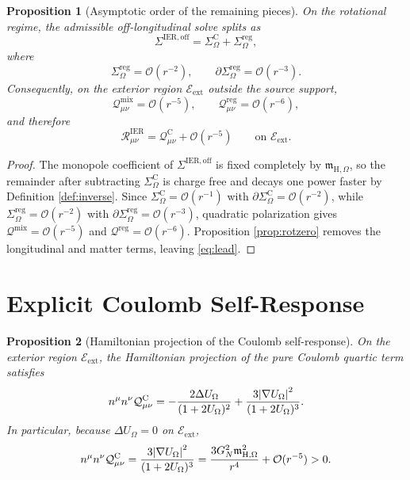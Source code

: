 \documentclass[11pt]{article}
\newcommand{\SigmaOff}{\Sigma^{\mathrm{IER,off}}}
\newcommand{\SigmaC}{\Sigma^{\mathrm{C}}}
\newcommand{\SigmaReg}{\Sigma^{\mathrm{reg}}}
\newcommand{\HamChargeOmega}{\mathfrak m_{\mathrm H,\Omega}}
\newcommand{\Exterior}{\mathcal E_{\mathrm{ext}}}
\newtheorem{proposition}{Proposition}
\begin{document}
\begin{proposition}[Asymptotic order of the remaining pieces]
\label{prop:orders}
On the rotational regime, the admissible off-longitudinal solve splits as
\begin{equation}
\SigmaOff=\SigmaC_\Omega+\SigmaReg_\Omega,
\label{eq:offsplit}
\end{equation}
where
\begin{equation}
\SigmaReg_\Omega=\mathcal O(r^{-2}),
\qquad
\partial\SigmaReg_\Omega=\mathcal O(r^{-3}).
\label{eq:regomega}
\end{equation}
Consequently, on the exterior region \(\Exterior\) outside the source support,
\begin{equation}
\mathcal Q_{\mu\nu}^{\mathrm{mix}}=\mathcal O(r^{-5}),
\qquad
\mathcal Q_{\mu\nu}^{\mathrm{reg}}=\mathcal O(r^{-6}),
\label{eq:qorders}
\end{equation}
and therefore
\begin{equation}
\mathcal R_{\mu\nu}^{\mathrm{IER}}
=
\mathcal Q_{\mu\nu}^{\mathrm C}
+\mathcal O(r^{-5})
\qquad
\text{on }\Exterior.
\label{eq:lead}
\end{equation}
\end{proposition}

\begin{proof}
The monopole coefficient of \(\SigmaOff\) is fixed completely by \(\HamChargeOmega\), so the remainder after subtracting \(\SigmaC_\Omega\) is charge free and decays one power faster by Definition \ref{def:inverse}. Since \(\SigmaC_\Omega=\mathcal O(r^{-1})\) with \(\partial\SigmaC_\Omega=\mathcal O(r^{-2})\), while \(\SigmaReg_\Omega=\mathcal O(r^{-2})\) with \(\partial\SigmaReg_\Omega=\mathcal O(r^{-3})\), quadratic polarization gives \(\mathcal Q^{\mathrm{mix}}=\mathcal O(r^{-5})\) and \(\mathcal Q^{\mathrm{reg}}=\mathcal O(r^{-6})\). Proposition \ref{prop:rotzero} removes the longitudinal and matter terms, leaving \eqref{eq:lead}.
\end{proof}

\section{Explicit Coulomb Self-Response}

\begin{proposition}[Hamiltonian projection of the Coulomb self-response]
\label{prop:coulomb}
On the exterior region \(\Exterior\), the Hamiltonian projection of the pure Coulomb quartic term satisfies
\begin{equation}
n^\mu n^\nu \mathcal Q_{\mu\nu}^{\mathrm C}
=
-\frac{2\Delta U_\Omega}{(1+2U_\Omega)^2}
+\frac{3\abs{\nabla U_\Omega}^2}{(1+2U_\Omega)^3}.
\label{eq:coulomb}
\end{equation}
In particular, because \(\Delta U_\Omega=0\) on \(\Exterior\),
\begin{equation}
n^\mu n^\nu \mathcal Q_{\mu\nu}^{\mathrm C}
=
\frac{3\abs{\nabla U_\Omega}^2}{(1+2U_\Omega)^3}
=
\frac{3G_N^2\HamChargeOmega^2}{r^4}
+\mathcal O(r^{-5})
>0.
\label{eq:coulombpositive}
\end{equation}
\end{proposition}
\end{document}
